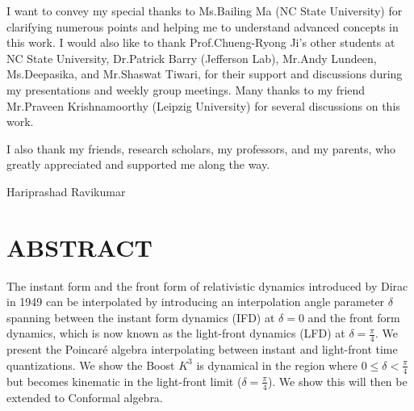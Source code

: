 \documentclass[12pt,a4paper]{report}
\begin{document}
I want to convey my special thanks to Ms.\@ Bailing Ma (NC State University) for clarifying numerous points and helping me to understand advanced concepts in this work. I would also like to thank Prof.\@ Chueng-Ryong Ji's other students at NC State University,  Dr.\@ Patrick Barry (Jefferson Lab), Mr.\@ Andy Lundeen, Ms.\@ Deepasika, and Mr.\@ Shaswat Tiwari, for their support and discussions during my presentations and weekly group meetings. Many thanks to my friend Mr.\@ Praveen Krishnamoorthy (Leipzig University) for several discussions on this work.

I also thank my friends, research scholars, my professors, and my parents, who greatly appreciated and supported me along the way.
\begin{flushright}
	Hariprashad Ravikumar
\end{flushright}
\clearpage
\section*{ABSTRACT}
\noindent{\rule{\textwidth}{1.5pt}}
The instant form and the front form of relativistic dynamics introduced by Dirac in 1949 can be interpolated by introducing an interpolation angle parameter $\delta$ spanning between the instant form dynamics (IFD) at $\delta=0$ and the front form dynamics, which is now known as the light-front dynamics (LFD) at $\delta=\frac{\pi}{4}$. We present the Poincaré algebra interpolating between instant and light-front time quantizations. We show the Boost $K^{3}$ is dynamical in the region where $0\leq\delta<\frac{\pi}{4}$ but becomes kinematic in the light-front limit ($\delta=\frac{\pi}{4}$). We show this will then be extended to Conformal algebra.
\clearpage

\tableofcontents



\end{document}
